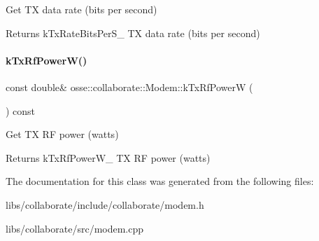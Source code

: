 Get TX data rate (bits per second) 

\begin{DoxyReturn}{Returns}
k\+Tx\+Rate\+Bits\+Per\+S\+\_\+ TX data rate (bits per second) 
\end{DoxyReturn}
\mbox{\label{classosse_1_1collaborate_1_1_modem_aa4af2bbf6ffd0c09e3a817620bb0354b}} 
\paragraph{\texorpdfstring{k\+Tx\+Rf\+Power\+W()}{kTxRfPowerW()}}
{\footnotesize\ttfamily const double\& osse\+::collaborate\+::\+Modem\+::k\+Tx\+Rf\+PowerW (\begin{DoxyParamCaption}{ }\end{DoxyParamCaption}) const\hspace{0.3cm}{\ttfamily [inline]}}



Get TX RF power (watts) 

\begin{DoxyReturn}{Returns}
k\+Tx\+Rf\+Power\+W\+\_\+ TX RF power (watts) 
\end{DoxyReturn}


The documentation for this class was generated from the following files\+:\begin{DoxyCompactItemize}
\item 
libs/collaborate/include/collaborate/modem.\+h\item 
libs/collaborate/src/modem.\+cpp\end{DoxyCompactItemize}
